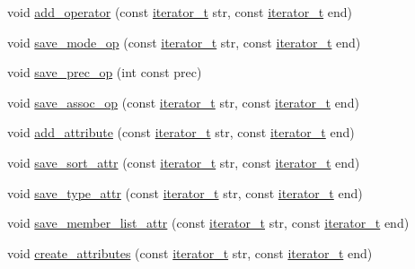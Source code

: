 \begin{DoxyCompactItemize}
\item 
void \hyperlink{namespacegenevalmag_a5651e2842c6f77725d4c10f46655ead4}{add\_\-operator} (const \hyperlink{namespacegenevalmag_a64946721fb97e58be670a468bf8e7056}{iterator\_\-t} str, const \hyperlink{namespacegenevalmag_a64946721fb97e58be670a468bf8e7056}{iterator\_\-t} end)
\item 
void \hyperlink{namespacegenevalmag_a6c04408088fac02746a5a14e9b10f304}{save\_\-mode\_\-op} (const \hyperlink{namespacegenevalmag_a64946721fb97e58be670a468bf8e7056}{iterator\_\-t} str, const \hyperlink{namespacegenevalmag_a64946721fb97e58be670a468bf8e7056}{iterator\_\-t} end)
\item 
void \hyperlink{namespacegenevalmag_a76626584a4d067440fb992103081af8a}{save\_\-prec\_\-op} (int const prec)
\item 
void \hyperlink{namespacegenevalmag_a3aa0e95a99ace1f802a226e24366f4fb}{save\_\-assoc\_\-op} (const \hyperlink{namespacegenevalmag_a64946721fb97e58be670a468bf8e7056}{iterator\_\-t} str, const \hyperlink{namespacegenevalmag_a64946721fb97e58be670a468bf8e7056}{iterator\_\-t} end)
\item 
void \hyperlink{namespacegenevalmag_a92edf3022d197c1c9587126d1aea5c9f}{add\_\-attribute} (const \hyperlink{namespacegenevalmag_a64946721fb97e58be670a468bf8e7056}{iterator\_\-t} str, const \hyperlink{namespacegenevalmag_a64946721fb97e58be670a468bf8e7056}{iterator\_\-t} end)
\item 
void \hyperlink{namespacegenevalmag_a48c1d5796cdb99233cf2dfe9d2224618}{save\_\-sort\_\-attr} (const \hyperlink{namespacegenevalmag_a64946721fb97e58be670a468bf8e7056}{iterator\_\-t} str, const \hyperlink{namespacegenevalmag_a64946721fb97e58be670a468bf8e7056}{iterator\_\-t} end)
\item 
void \hyperlink{namespacegenevalmag_a9669d56acdb87bd7130c7da9d810b53a}{save\_\-type\_\-attr} (const \hyperlink{namespacegenevalmag_a64946721fb97e58be670a468bf8e7056}{iterator\_\-t} str, const \hyperlink{namespacegenevalmag_a64946721fb97e58be670a468bf8e7056}{iterator\_\-t} end)
\item 
void \hyperlink{namespacegenevalmag_a8d8548aa085e3c04a2cb7abc9f5deacc}{save\_\-member\_\-list\_\-attr} (const \hyperlink{namespacegenevalmag_a64946721fb97e58be670a468bf8e7056}{iterator\_\-t} str, const \hyperlink{namespacegenevalmag_a64946721fb97e58be670a468bf8e7056}{iterator\_\-t} end)
\item 
void \hyperlink{namespacegenevalmag_a640285acc8edfe19e082795784dbbd51}{create\_\-attributes} (const \hyperlink{namespacegenevalmag_a64946721fb97e58be670a468bf8e7056}{iterator\_\-t} str, const \hyperlink{namespacegenevalmag_a64946721fb97e58be670a468bf8e7056}{iterator\_\-t} end)

\end{DoxyCompactItemize}
